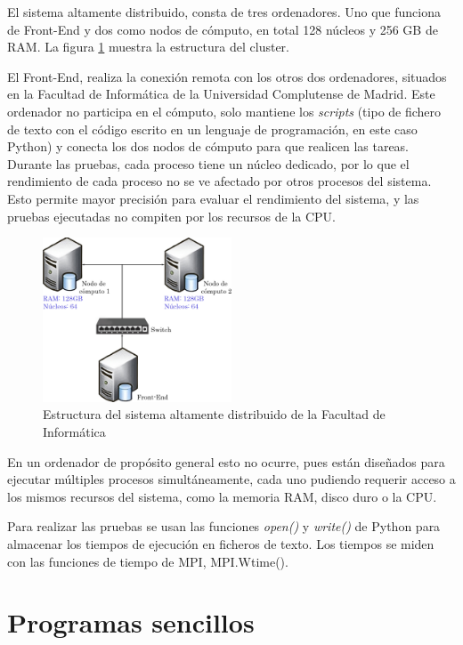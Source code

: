 El sistema altamente distribuido, consta de tres ordenadores. Uno que funciona de Front-End y dos como nodos de cómputo, en total 128 núcleos y 256 GB de RAM. La figura \ref{fig:cluster} muestra la estructura del cluster.




El Front-End, realiza la conexión remota con los otros dos ordenadores, situados en la Facultad de Informática de la Universidad Complutense de Madrid. Este ordenador no participa en el cómputo, solo mantiene los \textit{scripts} (tipo de fichero de texto con el código escrito en un lenguaje de programación, en este caso Python) y conecta los dos nodos de cómputo para que realicen las tareas.  Durante las pruebas, cada proceso tiene un núcleo dedicado, por lo que el rendimiento de cada proceso no se ve afectado por otros procesos del sistema. Esto permite mayor precisión para evaluar el rendimiento del sistema, y las pruebas ejecutadas no compiten por los recursos de la CPU. 


\vspace*{0.2cm}

\begin{figure}[!h]
	\centering
	\includegraphics[width=0.5\textwidth]{images/chapter_4/cluster}
	\caption{Estructura del sistema altamente distribuido de la Facultad de Informática}
	\label{fig:cluster}
\end{figure}

En un ordenador de propósito general esto no ocurre, pues están diseñados para ejecutar múltiples procesos simultáneamente, cada uno pudiendo requerir acceso a los mismos recursos del sistema, como la memoria RAM, disco duro o la CPU.

Para realizar las pruebas se usan las funciones \textit{open()} y \textit{write()} de Python para almacenar los tiempos de ejecución en ficheros de texto. Los tiempos se miden con las funciones de
tiempo de MPI, MPI.Wtime().

\section{Programas sencillos}


